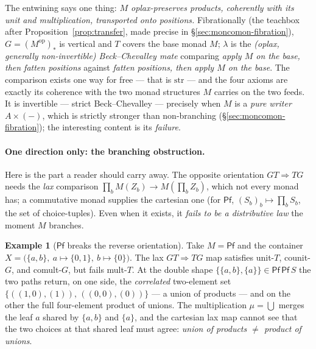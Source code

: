 \documentclass[11pt,a4paper]{book}
\newcommand{\op}{^{\mathrm{op}}}
\newcommand{\str}{\mathrm{str}}
\theoremstyle{plain}
\theoremstyle{definition}
\newtheorem{Example}[Theorem]{Example}
\theoremstyle{remark}
\begin{document}
\begin{teachbox}
The entwining says one thing: \emph{$M$ oplax-preserves products, coherently with its unit and
multiplication, transported onto positions.} Fibrationally (the teachbox after
Proposition~\ref{prop:transfer}, made precise in \S\ref{sec:moncomon-fibration}), $G=(M\op)_{*}$ is
vertical and $T$ covers the base monad $M$; $\lambda$ is the \emph{(oplax, generally non-invertible)
Beck--Chevalley mate} comparing \emph{apply $M$ on the base, then fatten positions} against
\emph{fatten positions, then apply $M$ on the base}. The comparison exists one way for free --- that is
$\str$ --- and the four axioms are exactly its coherence with the two monad structures $M$ carries on
the two feeds. It is invertible --- strict Beck--Chevalley --- precisely when $M$ is a \emph{pure writer}
$A\times(-)$, which is strictly stronger than non-branching (\S\ref{sec:moncomon-fibration}); the
interesting content is its \emph{failure}.
\end{teachbox}

\paragraph{One direction only: the branching obstruction.} Here is the part a reader should carry away.
The opposite orientation $GT\Rightarrow TG$ needs the \emph{lax} comparison
$\prod_{b}M(Z_{b})\to M(\prod_{b}Z_{b})$, which not every monad has; a commutative monad supplies the
cartesian one (for $\mathsf{Pf}$, $(S_{b})_{b}\mapsto\prod_{b}S_{b}$, the set of choice-tuples). Even
when it exists, it \emph{fails to be a distributive law} the moment $M$ branches.

\begin{Example}[$\mathsf{Pf}$ breaks the reverse orientation]\label{ex:entwine-branching}
Take $M=\mathsf{Pf}$ and the container $X=\bigl(\{a,b\},\ a\mapsto\{0,1\},\ b\mapsto\{0\}\bigr)$. The lax
$GT\Rightarrow TG$ map satisfies unit-$T$, counit-$G$, and comult-$G$, but fails mult-$T$. At the double
shape $\{\{a,b\},\{a\}\}\in\mathsf{Pf}\,\mathsf{Pf}\,S$ the two paths return, on one side, the
\emph{correlated} two-element set $\{((1,0),(1)),\,((0,0),(0))\}$ --- a union of products --- and on the
other the full four-element product of unions. The multiplication $\mu=\bigcup$ merges the leaf $a$
shared by $\{a,b\}$ and $\{a\}$, and the cartesian lax map cannot see that the two choices at that
shared leaf must agree: \emph{union of products $\neq$ product of unions}.
\end{Example}
\end{document}
